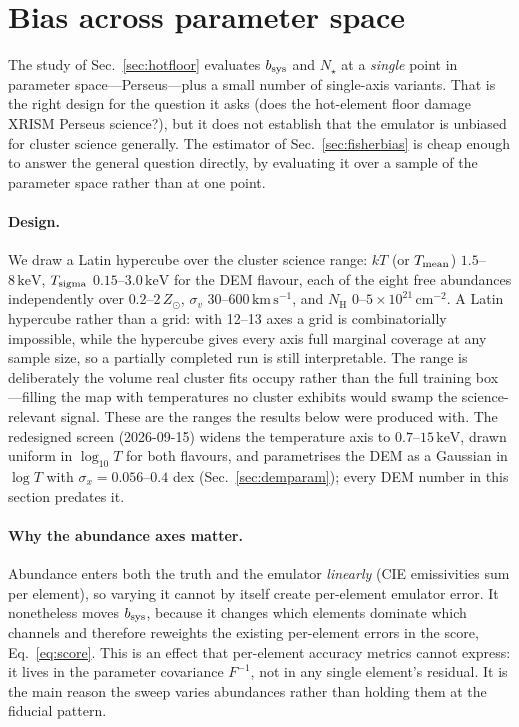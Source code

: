 \documentclass[11pt,a4paper]{article}
\newcommand{\nh}{N_{\mathrm{H}}}
\newcommand{\kev}{\,\mathrm{keV}}
\newcommand{\kms}{\,\mathrm{km\,s^{-1}}}
\newcommand{\zsun}{Z_\odot}
\begin{document}
\section{Bias across parameter space}\label{sec:biassweep}
The study of Sec.~\ref{sec:hotfloor} evaluates $b_{\rm sys}$ and $N_\star$ at a
\emph{single} point in parameter space---Perseus---plus a small number of
single-axis variants. That is the right design for the question it asks (does
the hot-element floor damage XRISM Perseus science?), but it does not establish
that the emulator is unbiased for cluster science generally. The estimator of
Sec.~\ref{sec:fisherbias} is cheap enough to answer the general question
directly, by evaluating it over a sample of the parameter space rather than at
one point.

\paragraph{Design.} We draw a Latin hypercube over the cluster science range:
$kT$ (or $T_{\rm mean}$) $1.5$--$8\kev$, $T_{\rm sigma}$ $0.15$--$3.0\kev$ for
the DEM flavour, each of the eight free abundances independently over
$0.2$--$2\,\zsun$, $\sigma_v$ $30$--$600\kms$, and $\nh$ $0$--$5\times10^{21}\,
\mathrm{cm^{-2}}$. A Latin hypercube rather than a grid: with 12--13 axes a grid
is combinatorially impossible, while the hypercube gives every axis full
marginal coverage at any sample size, so a partially completed run is still
interpretable. The range is deliberately the volume real cluster fits occupy
rather than the full training box---filling the map with temperatures no cluster
exhibits would swamp the science-relevant signal. These are the ranges the
results below were produced with. The redesigned screen (2026-09-15) widens the
temperature axis to $0.7$--$15\kev$, drawn uniform in $\log_{10}T$ for both
flavours, and parametrises the DEM as a Gaussian in $\log T$ with
$\sigma_x=0.056$--$0.4$ dex (Sec.~\ref{sec:demparam}); every DEM number in this
section predates it.

\paragraph{Why the abundance axes matter.} Abundance enters both the truth and
the emulator \emph{linearly} (CIE emissivities sum per element), so varying it
cannot by itself create per-element emulator error. It nonetheless moves
$b_{\rm sys}$, because it changes which elements dominate which channels and
therefore reweights the existing per-element errors in the score,
Eq.~\eqref{eq:score}. This is an effect that per-element accuracy metrics
cannot express: it lives in the parameter covariance $F^{-1}$, not in any
single element's residual. It is the main reason the sweep varies abundances
rather than holding them at the fiducial pattern.
\end{document}
